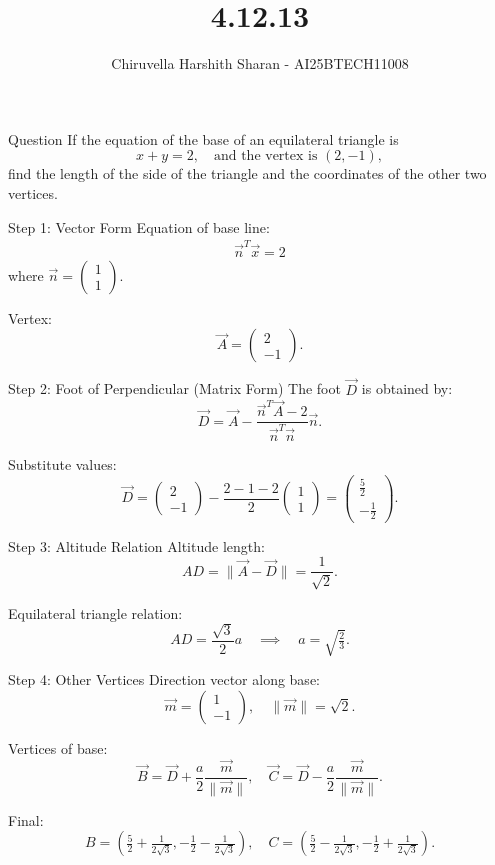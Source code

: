 \documentclass{beamer}
\title{4.12.13}
\author{Chiruvella Harshith Sharan - AI25BTECH11008}
\begin{document}
\frame{\titlepage}


\begin{frame}{Question}
If the equation of the base of an equilateral triangle is 
\[
x+y=2, \quad \text{and the vertex is } (2,-1),
\]
find the length of the side of the triangle and the coordinates of the other two vertices.
\end{frame}

\begin{frame}{Step 1: Vector Form}
Equation of base line:
\begin{align}
\vec{n}^T \vec{x} = 2 \tag{1}
\end{align}
where $\vec{n} = \begin{pmatrix}1 \\ 1\end{pmatrix}$.

Vertex:
\[
\vec{A} = \begin{pmatrix}2 \\ -1\end{pmatrix}.
\]
\end{frame}


\begin{frame}{Step 2: Foot of Perpendicular (Matrix Form)}
The foot $\vec{D}$ is obtained by:
\[
\vec{D} = \vec{A} - \frac{\vec{n}^T\vec{A}-2}{\vec{n}^T\vec{n}} \vec{n}.
\]

Substitute values:
\[
\vec{D} = \begin{pmatrix}2 \\ -1\end{pmatrix} - 
\frac{2-1-2}{2} \begin{pmatrix}1 \\ 1\end{pmatrix}
= \begin{pmatrix}\tfrac{5}{2} \\ -\tfrac{1}{2}\end{pmatrix}.
\]
\end{frame}


\begin{frame}{Step 3: Altitude Relation}
Altitude length:
\[
AD = \|\vec{A}-\vec{D}\| = \frac{1}{\sqrt{2}}.
\]

Equilateral triangle relation:
\[
AD = \frac{\sqrt{3}}{2}a \quad \implies \quad 
a = \sqrt{\tfrac{2}{3}}.
\]
\end{frame}


\begin{frame}{Step 4: Other Vertices}
Direction vector along base:
\[
\vec{m} = \begin{pmatrix}1 \\ -1\end{pmatrix}, \quad \|\vec{m}\|=\sqrt{2}.
\]

Vertices of base:
\[
\vec{B} = \vec{D} + \frac{a}{2}\frac{\vec{m}}{\|\vec{m}\|}, 
\quad 
\vec{C} = \vec{D} - \frac{a}{2}\frac{\vec{m}}{\|\vec{m}\|}.
\]

Final:
\[
B = \left(\tfrac{5}{2}+\tfrac{1}{2\sqrt{3}}, -\tfrac{1}{2}-\tfrac{1}{2\sqrt{3}}\right),
\quad
C = \left(\tfrac{5}{2}-\tfrac{1}{2\sqrt{3}}, -\tfrac{1}{2}+\tfrac{1}{2\sqrt{3}}\right).
\]
\end{frame}
\end{document}
